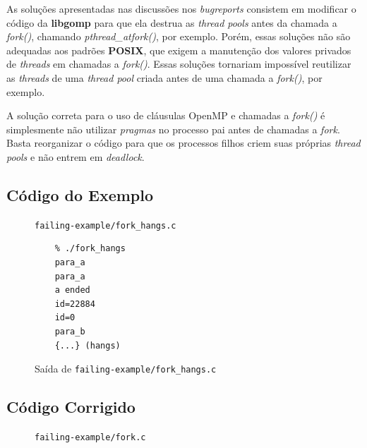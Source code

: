 \documentclass[a4paper, 12pt]{article}
\begin{document}
As soluções apresentadas nas discussões nos \textit{bugreports} consistem
em modificar o código da \textbf{libgomp} para que ela destrua as
\textit{thread pools} antes da chamada a \textit{fork()}, chamando
\textit{pthread\_atfork()}, por exemplo. Porém, essas soluções não são
adequadas aos padrões \textbf{POSIX}, que exigem a manutenção dos valores
privados de \textit{threads} em chamadas a \textit{fork()}. Essas soluções
tornariam impossível reutilizar as \textit{threads} de uma \textit{thread pool}
criada antes de uma chamada a \textit{fork()}, por exemplo.

A solução correta para o uso de cláusulas OpenMP e chamadas a \textit{fork()}
é simplesmente não utilizar \textit{pragmas} no processo pai antes de
chamadas a \textit{fork}. Basta reorganizar o código para que os processos
filhos criem suas próprias \textit{thread pools} e não entrem em
\textit{deadlock}.

\subsection{Código do Exemplo}\label{sec:example}
\begin{figure}[H]
    \centering
    
    \caption{\texttt{failing-example/fork\_hangs.c}}
    \label{fig:fork_hangs}
\end{figure}

\begin{figure}[H]
    \centering
    \begin{lstlisting}
    % ./fork_hangs
    para_a
    para_a
    a ended
    id=22884
    id=0
    para_b
    {...} (hangs)
    \end{lstlisting}
    \caption{Saída de \texttt{failing-example/fork\_hangs.c}}
    \label{fig:fork_hangs_out}
\end{figure}

\subsection{Código Corrigido}\label{sec:fixed}
\begin{figure}[H]
    \centering
    
    \caption{\texttt{failing-example/fork.c}}
    \label{fig:fork}
\end{figure}
\end{document}
